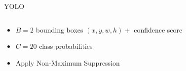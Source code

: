 \begin{frame}{YOLO}
\begin{columns}
    \begin{column}{0.5\textwidth}
    \begin{itemize}
        \item<3-> $B=2$ bounding boxes $(x,y,w,h) + $ confidence score
        \item<4-> $C=20$ class probabilities
        \vspace{1cm}
        \item<8-> Apply Non-Maximum Suppression
    \end{itemize}
    \end{column}
    
    \begin{column}{0.5\textwidth}


\end{column}
\end{columns}
\end{frame}

